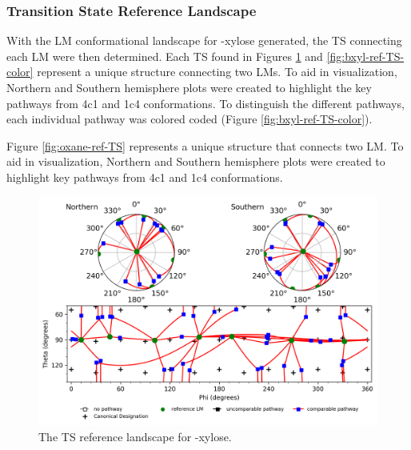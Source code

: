 \documentclass{article}
\begin{document}
\subsubsection{Transition State Reference Landscape}
With the LM conformational landscape for \textbeta-xylose generated, the TS connecting each LM were then determined. Each TS found in 
Figures \ref{fig:bxyl-ref-TS} and \ref{fig:bxyl-ref-TS-color} represent a unique structure connecting two LMs. To aid in visualization, Northern 
and Southern hemisphere plots were created to highlight the key pathways from 4c1 and 1c4 conformations. To distinguish the different 
pathways, each individual pathway was colored coded (Figure \ref{fig:bxyl-ref-TS-color}). 

Figure
\ref{fig:oxane-ref-TS} represents a unique structure that connects two LM. To aid in visualization, Northern and Southern hemisphere plots
were created to highlight key pathways from 4c1 and 1c4 conformations.

\begin{figure}[H]
  	\centering
  	\includegraphics[width=\textwidth,height=\textheight,keepaspectratio]
	{figures/bxyl/z_dataset-bxyl-TS-WRMSD-comp-reference.png}
	\caption{The TS reference landscape for \textbeta-xylose.}
 	\label{fig:bxyl-ref-TS}
\end{figure}
\end{document}
